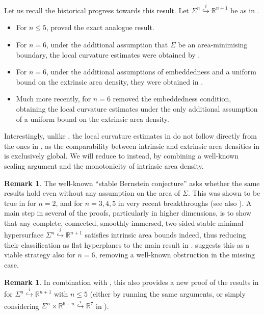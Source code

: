 \documentclass{article}
\newcommand{\R}{\mathbb{R}}
\theoremstyle{definition}
\newtheorem{remark}[theorem]{Remark}
\begin{document}
Let us recall the historical progress towards this result. Let $\Sigma^{n}\overset{i}{\hookrightarrow} \R^{n+1}$ be as in .
\begin{itemize}
    \item For $n\leq 5$, \cite{SSY75} proved the exact analogue result.
    \item For $n=6$, under the additional assumption that $\Sigma$ be an area-minimising boundary, the local curvature estimates were obtained by \cite{Simon76}.
    \item For $n = 6$, under the additional assumptions of embeddedness and a uniform bound on the extrinsic area density, they were obtained in \cite{SS81}.
    \item Much more recently, for $n = 6$ \cite{Bel25} removed the embeddedness condition, obtaining the local curvature estimates under the only additional assumption of a uniform bound on the extrinsic area density.
\end{itemize}
Interestingly, unlike , the local curvature estimates in  do not follow directly from the ones in \cite{Bel25}, as the comparability between intrinsic and extrinsic area densities in  is exclusively global. We will reduce  to  instead, by combining a well-known scaling argument and the monotonicity of intrinsic area density.
\begin{remark}
    The well-known ``stable Bernstein conjecture'' asks whether the same results hold even without any assumption on the area of $\Sigma$. This was shown to be true in \cite{FS80, DP79, Pog81} for $n=2$, and for $n=3,4,5$ in very recent breakthroughs \cite{CL24, CLMS25, Maz24} (see also \cite{CL23, CMR24, CCMMA26, Str26}). A main step in several of the proofs, particularly in higher dimensions, is to show that any complete, connected, smoothly immersed, two-sided stable minimal hypersurface $\Sigma^n\overset{i}{\hookrightarrow}\R^{n+1}$ satisfies intrinsic area bounds indeed, thus reducing their classification as flat hyperplanes to the main result in \cite{SSY75}.  suggests this as a viable strategy also for $n=6$, removing a well-known obstruction in the missing case.
\end{remark}
\begin{remark}
    In combination with \cite{Bel25}, this also provides a new proof of the results in \cite{SSY75} for $\Sigma^n\overset{i}{\hookrightarrow} \R^{n+1}$ with $n\leq 5$ (either by running the same arguments, or simply considering $\Sigma^n\times\R^{6-n}\overset{i}{\hookrightarrow} \R^{7}$ in ).
\end{remark}
\end{document}
